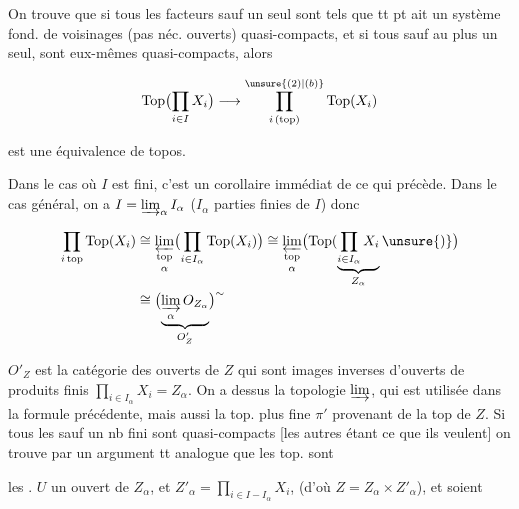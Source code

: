 On trouve que si tous les facteurs sauf  un seul sont tels que tt pt ait un système fond. de voisinages (pas néc. ouverts) quasi-compacts, et si tous sauf au plus un seul, sont  eux-mêmes quasi-compacts, alors

\[
\mathrm{Top}\bigl(\prod_{i\in I}X_i\bigr)\longrightarrow\prod_{i\,(\mathrm{top})}^{\unsure{(2)|(b)}}\mathrm{Top}(X_i)
\]

est une équivalence de topos.


Dans le cas où $I$ est fini, c'est un corollaire immédiat de ce qui précède. Dans le cas général, on a $I=\varinjlim_\alpha I_\alpha$ ($I_\alpha$ parties finies de $I$) donc

\[
\begin{aligned}
\prod_{i\,\mathrm{top}}\mathrm{Top}(X_i)
 &\cong\mathop{\varprojlim_{\mathrm{top}}}_{\alpha}\bigl(\prod_{i\in I_\alpha}\mathrm{Top}(X_i)\bigr)
 \cong\mathop{\varprojlim_{\mathrm{top}}}_{\alpha}\bigl(\mathrm{Top}(\underbrace{\prod_{i\in I_\alpha}X_i}_{Z_\alpha}\unsure{)}\bigr)\\
 &\cong\bigl(\underbrace{\varinjlim_\alpha O_{Z_\alpha}}_{O'_Z}\bigr)^{\sim}
\end{aligned}
\]

$O'_Z$ est la catégorie des ouverts de $Z$  qui sont images inverses d'ouverts de produits finis $\prod_{i\in I_\alpha}X_i=Z_\alpha$.  On  a dessus la topologie  $\varinjlim$, qui  est utilisée dans la formule précédente, mais aussi la top. plus fine $\pi'$ provenant de la top de $Z$. Si tous les   sauf un nb fini sont quasi-compacts [les autres étant ce que ils veulent] on trouve par un argument tt analogue  que les top. sont

les .    $U$ un ouvert de $Z_\alpha$, et $Z'_\alpha=\prod_{i\in I-I_\alpha}X_i$, (d'où $Z=Z_\alpha\times Z'_\alpha$), et soient

